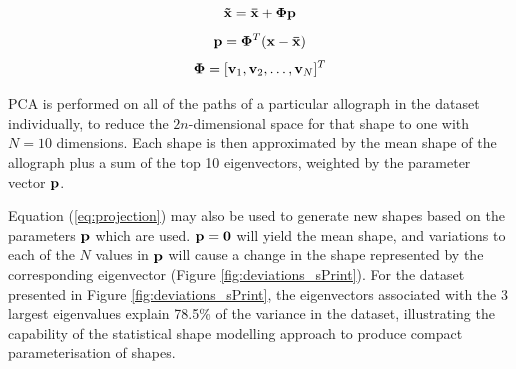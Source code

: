 \documentclass{sig-alternate}
\begin{document}
\begin{equation}\label{eq:projection}
{\bf \tilde{x}=\bar{x}+\Phi p}
\end{equation}
\begin{equation}\label{eq:paramCalc}
{\bf p} ={\bf \Phi}^T ({\bf {x}-\bar{x}})
\end{equation}
\begin{equation}\label{eq:transformCalc}
{\bf \Phi} = [{\bf v}_1, {\bf v}_2, \ldots, {\bf v}_N]^T
\end{equation}

PCA is performed on all of the paths of a particular allograph in the dataset
individually, to reduce the $2n$-dimensional space for that shape to one with
$N=10$ dimensions.  Each shape is then approximated by the mean shape of the
allograph plus a sum of the top 10 eigenvectors, weighted by the parameter
vector ${\bf p}$. 

%

Equation (\ref{eq:projection}) may also be used to generate new shapes based on
the parameters ${\bf p}$ which are used. ${\bf p}={\bf 0}$ will yield the mean
shape, and variations to each of the $N$ values in ${\bf p}$ will cause a change
in the shape represented by the corresponding eigenvector (Figure
\ref{fig:deviations_sPrint}).  For the dataset presented in Figure
\ref{fig:deviations_sPrint}, the eigenvectors associated with the 3 largest
eigenvalues explain 78.5\% of the variance in the dataset, illustrating the
capability of the statistical shape modelling approach to produce compact
parameterisation of shapes. 
\end{document}
